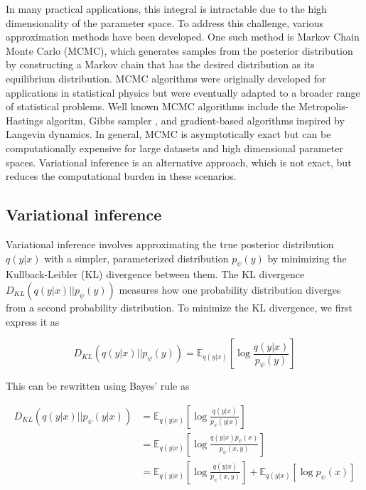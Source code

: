 In many practical applications, this integral is intractable due to the high dimensionality of the parameter space. To address this challenge, various approximation methods have been developed. One such method is Markov Chain Monte Carlo (MCMC), which generates samples from the posterior distribution by constructing a Markov chain that has the desired distribution as its equilibrium distribution. MCMC algorithms were originally developed for applications in statistical physics but were eventually adapted to a broader range of statistical problems. Well known MCMC algorithms include the Metropolis-Hastings algoritm, Gibbs sampler \parencite{Geman1984}, and gradient-based algorithms inspired by Langevin dynamics. In general, MCMC is asymptotically exact but can be computationally expensive for large datasets and high dimensional parameter spaces. Variational inference is an alternative approach, which is not exact, but reduces the computational burden in these scenarios.

\subsection{Variational inference}

Variational inference involves approximating the true posterior distribution \( q(y \lvert x) \) with a simpler, parameterized distribution \( p_{\psi}(y) \) by minimizing the Kullback-Leibler (KL) divergence between them. The KL divergence \( D_{KL}(q(y \lvert x) \lvert\lvert p_{\psi}(y)) \) measures how one probability distribution diverges from a second probability distribution. To minimize the KL divergence, we first express it as

\begin{equation}
D_{KL}(q(y \lvert x) \lvert\lvert p_{\psi}(y)) = \mathbb{E}_{q(y \lvert x)}\left[\log \frac{q(y \lvert x)}{p_{\psi}(y)}\right]
\end{equation}

This can be rewritten using Bayes' rule as

\begin{align*}
D_{KL}(q(y \lvert x) \lvert\lvert p_{\psi}(y\lvert x)) &= \mathbb{E}_{q(y \lvert x)}\left[\log \frac{q(y \lvert x)}{p_{\psi}(y\lvert x)}\right] \\
&= \mathbb{E}_{q(y \lvert x)}\left[\log \frac{q(y\lvert x)p_{\psi}(x)}{p_{\psi}(x,y)} \right]\\
&= \mathbb{E}_{q(y \lvert x)}\left[\log \frac{q(y\lvert x)}{p_{\psi}(x,y)} \right] + \mathbb{E}_{q(y \lvert x)}\left[\log p_{\psi}(x) \right]
\end{align*}

